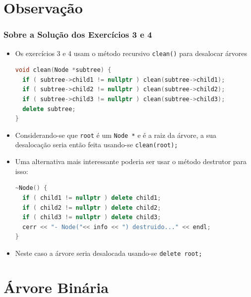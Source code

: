 \documentclass[aspectratio=169]{beamer}
\begin{document}
\section{Observação}

\begin{frame}[fragile]\frametitle{Sobre a Solução dos Exercícios 3 e 4}
\begin{itemize}
	\item Os exercícios 3 e 4 usam o método recursivo \texttt{clean()} para desalocar árvores
\begin{lstlisting}[language=C++,basicstyle=\ttfamily\tiny]
void clean(Node *subtree) {
  if ( subtree->child1 != nullptr ) clean(subtree->child1);
  if ( subtree->child2 != nullptr ) clean(subtree->child2);
  if ( subtree->child3 != nullptr ) clean(subtree->child3);
  delete subtree;
}
\end{lstlisting}
	\item Considerando-se que \texttt{root} é um \texttt{Node *} e é a raiz da árvore, a sua desalocação seria então feita usando-se \texttt{clean(root);}
\item Uma alternativa mais interessante poderia ser usar o método destrutor para isso:
\begin{lstlisting}[language=C++,basicstyle=\ttfamily\tiny]
~Node() {
  if ( child1 != nullptr ) delete child1;
  if ( child2 != nullptr ) delete child2;
  if ( child3 != nullptr ) delete child3;
  cerr << "- Node("<< info << ") destruido..." << endl;
}
\end{lstlisting}
	\item Neste caso a árvore seria desalocada usando-se \texttt{delete root;}
\end{itemize}
\end{frame}

\section{Árvore Binária}
\end{document}
